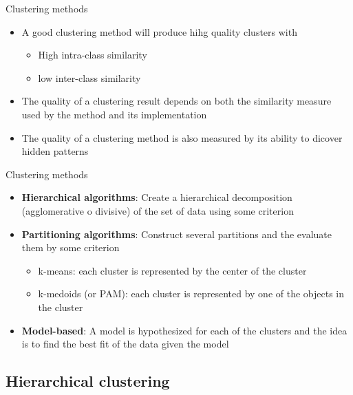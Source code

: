 \documentclass[10pt,xcolor=dvipsnames]{beamer}\usepackage[]{graphicx}\usepackage[]{color}
\begin{document}
\begin{frame}{Clustering methods}

\begin{itemize}
 \item A good clustering method will produce hihg quality clusters with
   \begin{itemize}
    \item High intra-class similarity
    \item low inter-class similarity
   \end{itemize} 
 \item The quality of a clustering result depends on both the similarity measure used
       by the method and its implementation
 \item The quality of a clustering method is also measured by its ability to dicover hidden patterns
      
\end{itemize}

\end{frame}



\begin{frame}{Clustering methods}

\begin{itemize}
 \item \textbf{Hierarchical algorithms}: Create a hierarchical decomposition
        (agglomerative o divisive) of the set of data using some criterion
 \item \textbf{Partitioning algorithms}: Construct several partitions and the evaluate them by some
        criterion 
     \begin{itemize}
       \item k-means: each cluster is represented by the center of the cluster
       \item k-medoids (or PAM): each cluster is represented by one of the objects in the cluster
     \end{itemize}
 \item \textbf{Model-based}: A model is hypothesized for each of the clusters and the idea is to find
        the best fit of the data given the model
      
\end{itemize}

\end{frame}


\subsection{Hierarchical clustering}
\end{document}
